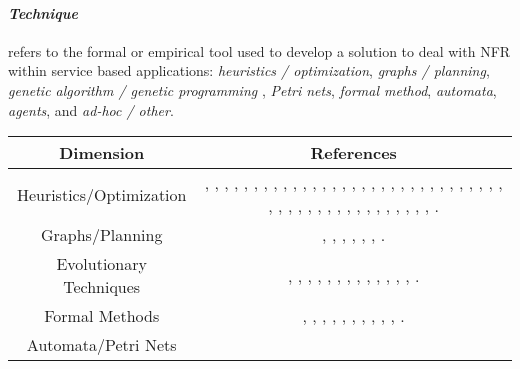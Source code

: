 \paragraph {\bf\em Technique} 
refers to the formal or empirical tool used to develop a solution to deal with NFR within service based applications:  {\em heuristics / optimization},	{\em graphs / planning},	{\em genetic algorithm / genetic programming}	, {\em Petri nets},	{\em formal method},	{\em automata},	{\em agents},	and {\em ad-hoc / other}.

\begin{table}\centering
\footnotesize
\begin{tabular}{|c|c|}\hline
\textbf{Dimension} & \textbf{References} \\ \hline
Heuristics/Optimization	& 
\parbox{0.6\textwidth}{
\cite{p001}, \cite{p003}, \cite{p004}, \cite{p007}, \cite{p008}, \cite{p011}, \cite{p015}, \cite{p016},  \cite{p025}, \cite{p026}, \cite{p033}, \cite{p036}, \cite{p037}, \cite{p048}, \cite{p056}, \cite{p060}, \cite{p077}, \cite{p079}, \cite{p081}, \cite{p082}, \cite{p084}, \cite{p085}, \cite{p095}, \cite{p102}, \cite{p103}, \cite{p104}, \cite{p106}, \cite{p118}, \cite{p122}, \cite{p123}, \cite{p125}, \cite{p127}, \cite{p128}, \cite{p129}, \cite{p130}, \cite{p131}, \cite{p132}, \cite{p133}, \cite{p135}, \cite{p139}, \cite{p145}, \cite{p148}, \cite{p154}, \cite{p155}, \cite{p158}, \cite{p161}, \cite{p166}, \cite{p167}, \cite{p170}.
}
\\ \hline
Graphs/Planning	& 
\parbox{0.6\textwidth}{
\cite{p010}, \cite{p072}, \cite{p116}, \cite{p142}, \cite{p143}, \cite{p152}, \cite{p167}.
}
\\ \hline
Evolutionary Techniques		&
\parbox{0.6\textwidth}{
\cite{p008}, \cite{p009}, \cite{p020}, \cite{p030}, \cite{p031}, \cite{p032}, \cite{p036}, \cite{p051}, \cite{p068}, \cite{p113}, \cite{p117}, \cite{p125}, \cite{p137}, \cite{p147}.
}
\\ \hline
Formal Methods	&
\parbox{0.6\textwidth}{
\cite{p027}, \cite{p041}, \cite{p055}, \cite{p070}, \cite{p090}, \cite{p092}, \cite{p097}, \cite{p104}, \cite{p112}, \cite{p136}, \cite{p165}.
}
\\ \hline
Automata/Petri Nets	&	
\parbox{0.6\textwidth}{
}
\end{tabular}
\end{table}
